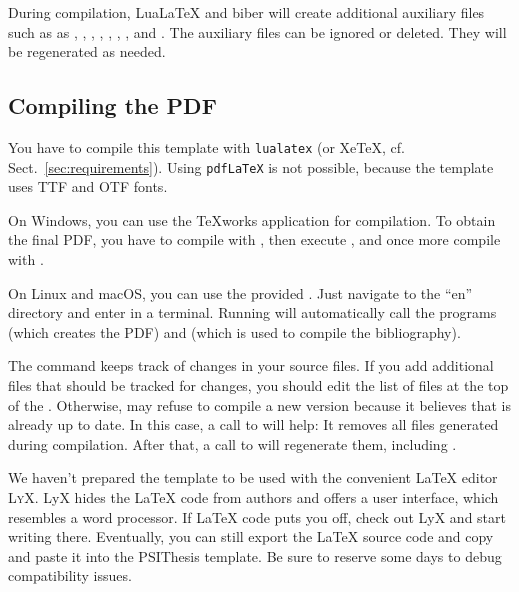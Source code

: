 During compilation, LuaLaTeX and biber will create additional auxiliary files such as as
, , , ,
, , , and .
The auxiliary files can be ignored or deleted. They will be regenerated  as needed.


\subsection{Compiling the PDF}
\label{sec:compile}

You have to compile this template with \texttt{lualatex} (or XeTeX, cf. Sect.~\ref{sec:requirements}). Using \texttt{pdfLaTeX} is not possible, because the template uses TTF and OTF fonts.

On Windows, you can use the TeXworks application for compilation. To obtain the final PDF, you have to compile  with , then execute , and once more compile  with .

On Linux and macOS, you can use the provided .
Just navigate to the ``en'' directory and enter  in a terminal. Running  will automatically call the programs  (which creates the PDF) and  (which is used to compile the bibliography).

The  command keeps track of changes in your source files. If you add additional files that should be tracked for changes, you should edit the list of files at the top of the .
Otherwise,  may refuse to compile a new version because it believes that  is already up to date. In this case, a call to  will help: It removes all files generated during compilation. After that, a call to  will regenerate them, including .


We haven't prepared the template to be used with the convenient LaTeX editor \textsc{LyX}. LyX hides the LaTeX code from authors and offers a user interface, which resembles a word processor.
If LaTeX code puts you off, check out LyX and start writing there. Eventually, you can still export the LaTeX source code and copy and paste it into the PSIThesis template. Be sure to reserve some days to debug compatibility issues.

